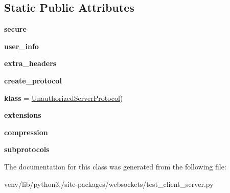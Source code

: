 \subsection*{Static Public Attributes}
\begin{DoxyCompactItemize}
\item 
\mbox{\label{classwebsockets_1_1test__client__server_1_1_client_server_tests_a11f2cc6ff23ac0c84ddfd1b9c87c935c}} 
{\bfseries secure}
\item 
\mbox{\label{classwebsockets_1_1test__client__server_1_1_client_server_tests_a2a23e6de9994d57122c1cbada0991c1a}} 
{\bfseries user\+\_\+info}
\item 
\mbox{\label{classwebsockets_1_1test__client__server_1_1_client_server_tests_aa943239662b0491e00677e1c84e09ad2}} 
{\bfseries extra\+\_\+headers}
\item 
\mbox{\label{classwebsockets_1_1test__client__server_1_1_client_server_tests_ae1ea1b10330b07be4ae96b059aff9325}} 
{\bfseries create\+\_\+protocol}
\item 
\mbox{\label{classwebsockets_1_1test__client__server_1_1_client_server_tests_a45578f1ccfafd748098ba1f548140d10}} 
{\bfseries klass} = \hyperlink{classwebsockets_1_1test__client__server_1_1_unauthorized_server_protocol}{Unauthorized\+Server\+Protocol})
\item 
\mbox{\label{classwebsockets_1_1test__client__server_1_1_client_server_tests_ac3d897d083cba0d36080d5f3801b4ad4}} 
{\bfseries extensions}
\item 
\mbox{\label{classwebsockets_1_1test__client__server_1_1_client_server_tests_a719e3b165c0de1194bdbeed66818d417}} 
{\bfseries compression}
\item 
\mbox{\label{classwebsockets_1_1test__client__server_1_1_client_server_tests_a954364d4b34eab942f943364b0e35a4a}} 
{\bfseries subprotocols}
\end{DoxyCompactItemize}


The documentation for this class was generated from the following file\+:\begin{DoxyCompactItemize}
\item 
venv/lib/python3./site-\/packages/websockets/test\+\_\+client\+\_\+server.\+py\end{DoxyCompactItemize}
